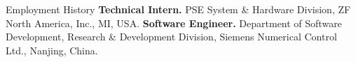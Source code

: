 \begin{rubric}{Employment History}
\entry*[2021 -- 2021]%
	\textbf{Technical Intern.} PSE System \& Hardware Division, ZF North America, Inc., MI, USA.
%
%
\entry*[2010 -- 2016]%
	\textbf{Software Engineer.} Department of Software Development, Research \& Development Division, Siemens Numerical Control Ltd., Nanjing, China.
%
\end{rubric}